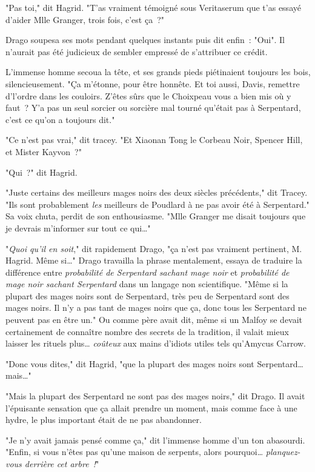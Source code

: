 "Pas toi," dit Hagrid. "T'as vraiment témoigné sous Veritaserum que t'as essayé d'aider Mlle Granger, trois fois, c'est ça~?"

Drago soupesa ses mots pendant quelques instants puis dit enfin~: "Oui". Il n'aurait pas été judicieux de sembler empressé de s'attribuer ce crédit.

L'immense homme secoua la tête, et ses grands pieds piétinaient toujours les bois, silencieusement. "Ça m'étonne, pour être honnête. Et toi aussi, Davis, remettre d'l'ordre dans les couloirs. Z'êtes sûrs que le Choixpeau vous a bien mis où y faut~? Y'a pas un seul sorcier ou sorcière mal tourné qu'était pas à Serpentard, c'est ce qu'on a toujours dit."

"Ce n'est pas vrai," dit tracey. "Et Xiaonan Tong le Corbeau Noir, Spencer Hill, et Mister Kayvon~?"

"Qui~?" dit Hagrid.

"Juste certains des meilleurs mages noirs des deux siècles précédents," dit Tracey. "Ils sont probablement \emph{les} meilleurs de Poudlard à ne pas avoir été à Serpentard." Sa voix chuta, perdit de son enthousiasme. "Mlle Granger me disait toujours que je devrais m'informer sur tout ce qui…"

"\emph{Quoi qu'il en soit}," dit rapidement Drago, "ça n'est pas vraiment pertinent, M. Hagrid. Même si…" Drago travailla la phrase mentalement, essaya de traduire la différence entre \emph{probabilité de Serpentard sachant mage noir} et \emph{probabilité de mage noir sachant Serpentard} dans un langage non scientifique. "Même si la plupart des mages noirs sont de Serpentard, très peu de Serpentard sont des mages noirs. Il n'y a pas tant de mages noirs que ça, donc tous les Serpentard ne peuvent pas en être un." Ou comme père avait dit, même si un Malfoy se devait certainement de connaître nombre des secrets de la tradition, il valait mieux laisser les rituels plus… \emph{coûteux} aux mains d'idiots utiles tels qu'Amycus Carrow.

"Donc vous dites," dit Hagrid, "que la plupart des mages noirs sont Serpentard… mais…"

"Mais la plupart des Serpentard ne sont pas des mages noirs," dit Drago. Il avait l'épuisante sensation que ça allait prendre un moment, mais comme face à une hydre, le plus important était de ne pas abandonner.

"Je n'y avait jamais pensé comme ça," dit l'immense homme d'un ton abasourdi. "Enfin, si vous n'êtes pas qu'une maison de serpents, alors pourquoi… \emph{planquez-vous derrière cet arbre~!}"

